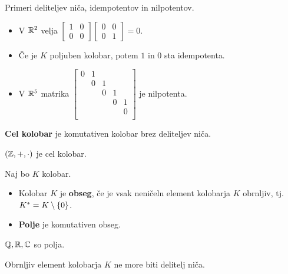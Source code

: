 \begin{zgled}
    Primeri deliteljev niča, idempotentov in nilpotentov.
    \begin{itemize}
        \item V $\mathbb{R}^2$ velja $\begin{bmatrix}
            1 & 0 \\ 0 & 0
        \end{bmatrix} \begin{bmatrix}
            0 & 0 \\ 0 & 1
        \end{bmatrix} = 0$.
        \item Če je $K$ poljuben kolobar, potem $1$ in $0$ sta idempotenta.
        \item V $\mathbb{R}^5$ matrika $\begin{bmatrix}
            0 & 1 & & & \\ 
            & 0 & 1 & & \\ 
            & & 0 & 1 & \\ 
            & & & 0 & 1 \\ 
            & & &  & 0 \\ 
        \end{bmatrix}$ je nilpotenta.
    \end{itemize}
\end{zgled}

\begin{definicija}
    \textbf{Cel kolobar} je komutativen kolobar brez deliteljev niča.
\end{definicija}

\begin{primer}
    $(\mathbb{Z}, +, \cdot)$ je cel kolobar.
\end{primer}

\begin{definicija}
    Naj bo $K$ kolobar.
    \begin{itemize}
        \item Kolobar $K$ je \textbf{obseg}, če je vsak neničeln element kolobarja $K$ obrnljiv, tj. $K^* = K \setminus \left\{0\right\}$. 
        \item \textbf{Polje} je komutativen obseg.
    \end{itemize}
\end{definicija}

\begin{primer}
    $\mathbb{Q}, \mathbb{R}, \mathbb{C}$ so polja.
\end{primer}

\begin{trditev}
    Obrnljiv element kolobarja $K$ ne more biti delitelj niča.
\end{trditev}

